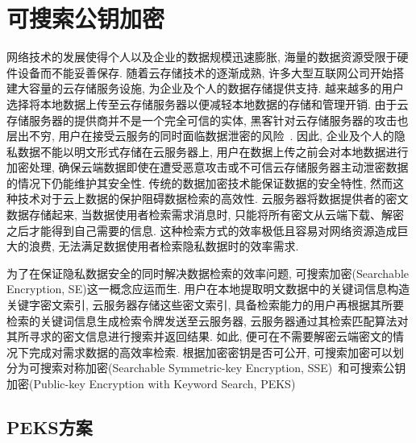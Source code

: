 \section{可搜索公钥加密}

网络技术的发展使得个人以及企业的数据规模迅速膨胀, 海量的数据资源受限于硬件设备而不能妥善保存. 随着云存储技术的逐渐成熟, 许多大型互联网公司开始搭建大容量的云存储服务设施, 为企业及个人的数据存储提供支持. 越来越多的用户选择将本地数据上传至云存储服务器以便减轻本地数据的存储和管理开销. 由于云存储服务器的提供商并不是一个完全可信的实体, 黑客针对云存储服务器的攻击也层出不穷, 用户在接受云服务的同时面临数据泄密的风险~\cite{KMAF-ISTAS-2021}. 因此, 企业及个人的隐私数据不能以明文形式存储在云服务器上, 用户在数据上传之前会对本地数据进行加密处理, 确保云端数据即使在遭受恶意攻击或不可信云存储服务器主动泄密数据的情况下仍能维护其安全性. 传统的数据加密技术能保证数据的安全特性, 然而这种技术对于云上数据的保护阻碍数据检索的高效性. 云服务器将数据提供者的密文数据存储起来, 当数据使用者检索需求消息时, 只能将所有密文从云端下载、解密之后才能得到自己需要的信息. 这种检索方式的效率极低且容易对网络资源造成巨大的浪费, 无法满足数据使用者检索隐私数据时的效率需求.

为了在保证隐私数据安全的同时解决数据检索的效率问题, 可搜索加密(Searchable Encryption, SE)这一概念应运而生. 用户在本地提取明文数据中的关键词信息构造关键字密文索引, 云服务器存储这些密文索引, 具备检索能力的用户再根据其所要检索的关键词信息生成检索令牌发送至云服务器, 云服务器通过其检索匹配算法对其所寻求的密文信息进行搜索并返回结果. 如此, 便可在不需要解密云端密文的情况下完成对需求数据的高效率检索. 根据加密密钥是否可公开, 可搜索加密可以划分为可搜索对称加密(Searchable Symmetric-key Encryption, SSE)~\cite{SWP-SP-2000}和可搜索公钥加密(Public-key Encryption with Keyword Search, PEKS)~\cite{BDOP2004}


\subsection{PEKS方案}
